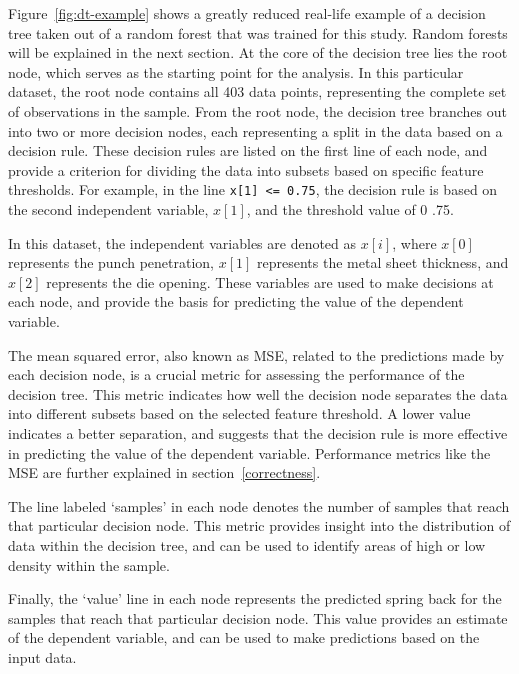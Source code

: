 Figure~\ref{fig:dt-example} shows a greatly reduced real-life example of a decision tree taken out of a random forest
that was trained for this study. Random forests will be explained in the next section.
At the core of the decision tree lies the root node, which serves as the starting point for the analysis.
In this particular dataset, the root node contains all 403 data points, representing the complete set of observations
in the sample.
From the root node, the decision tree branches out into two or more decision nodes, each representing a split in the
data based on a decision rule.
These decision rules are listed on the first line of each node, and provide a criterion for dividing the data into
subsets based on specific feature thresholds.
For example, in the line \texttt{x[1] <= 0.75}, the decision rule is based on the second independent variable,
$x[1]$, and the threshold value of 0 .75.

In this dataset, the independent variables are denoted as $x[i]$, where $x[0]$ represents the punch penetration,
$x[1]$ represents the metal sheet thickness, and $x[2]$ represents the die opening. These variables are used to make
decisions at each node, and provide the basis for predicting the value of the dependent variable.

The mean squared error, also known as MSE, related to the predictions made by each decision node, is a crucial metric
for assessing the performance of the decision tree.
This metric indicates how well the decision node separates the data into different subsets based on the selected
feature threshold.
A lower value indicates a better separation, and suggests that the decision rule is more effective in predicting the
value of the dependent variable.
Performance metrics like the \ac{MSE} are further explained in section~\ref{correctness}.

The line labeled `samples' in each node denotes the number of samples that reach that particular decision node.
This metric provides insight into the distribution of data within the decision tree, and can be used to identify
areas of high or low density within the sample.

Finally, the `value' line in each node represents the predicted spring back for the samples that reach that
particular decision node.
This value provides an estimate of the dependent variable, and can be used to make predictions based on the input data.


